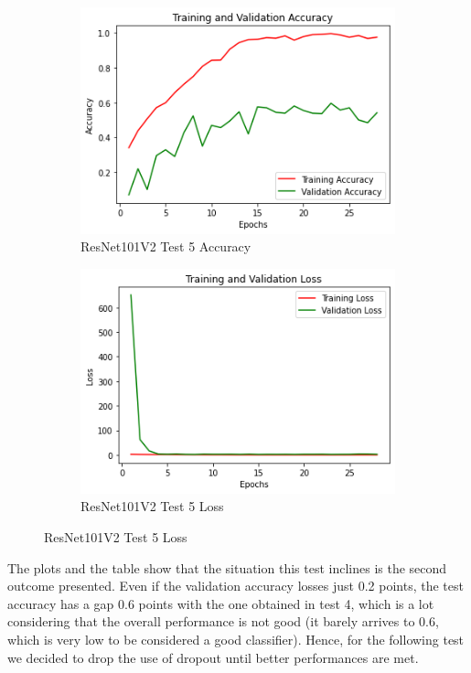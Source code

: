 \begin{figure}[H]
	\begin{subfigure}{0.5\textwidth}
		\includegraphics[width=0.9\linewidth]{img/resnet101v2/resnet101ft4_drop_acc.png} 
		\caption{ResNet101V2 Test 5 Accuracy}
		\label{fig:resnet101ft4dropacc}
	\end{subfigure}
	\begin{subfigure}{0.5\textwidth}
		\includegraphics[width=0.9\linewidth]{img/resnet101v2/resnet101ft4_drop_loss.png}
		\caption{ResNet101V2 Test 5 Loss}
		\label{fig:resnet101ft4droploss}
	\end{subfigure}
\end{figure}

The plots and the table show that the situation this test inclines is the second outcome presented. Even if the validation accuracy losses just 0.2 points, the test accuracy has a gap 0.6 points with the one obtained in test 4, which is a lot considering that the overall performance is not good (it barely arrives to 0.6, which is very low to be considered a good classifier). Hence, for the following test we decided to drop the use of dropout until better performances are met.



